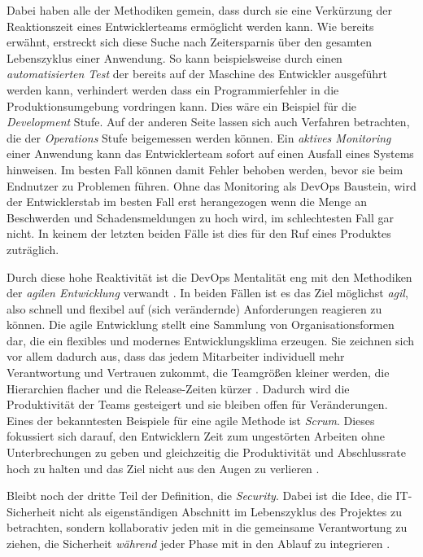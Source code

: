 Dabei haben alle der Methodiken gemein, dass durch sie eine Verkürzung der Reaktionszeit eines Entwicklerteams ermöglicht werden kann. 
Wie bereits erwähnt, erstreckt sich diese Suche nach Zeitersparnis über den gesamten Lebenszyklus einer Anwendung. So kann beispielsweise durch einen \emph{automatisierten Test} der bereits auf der Maschine des Entwickler ausgeführt werden kann, verhindert werden dass ein Programmierfehler in die Produktionsumgebung vordringen kann. Dies wäre ein Beispiel für die \emph{Development} Stufe. Auf der anderen Seite lassen sich auch Verfahren betrachten, die der \emph{Operations} Stufe beigemessen werden können. Ein \emph{aktives Monitoring} einer Anwendung kann das Entwicklerteam sofort auf einen Ausfall eines Systems hinweisen. Im besten Fall können damit Fehler behoben werden, bevor sie beim Endnutzer zu Problemen führen. Ohne das Monitoring als DevOps Baustein, wird der Entwicklerstab im besten Fall erst herangezogen wenn die Menge an Beschwerden und Schadensmeldungen zu hoch wird, im schlechtesten Fall gar nicht. In keinem der letzten beiden Fälle ist dies für den Ruf eines Produktes zuträglich.

Durch diese hohe Reaktivität ist die DevOps Mentalität eng mit den Methodiken der \emph{agilen Entwicklung} verwandt \cite{haufe-lexwaregmbhcokgAgileMethodenDefinition}. In beiden Fällen ist es das Ziel möglichst \emph{agil}, also schnell und flexibel auf (sich verändernde) Anforderungen reagieren zu können.
Die agile Entwicklung stellt eine Sammlung von Organisationsformen dar, die ein flexibles und modernes Entwicklungsklima erzeugen. Sie zeichnen sich vor allem dadurch aus, dass das jedem Mitarbeiter individuell mehr Verantwortung und Vertrauen zukommt, die Teamgrößen kleiner werden, die Hierarchien flacher und die Release-Zeiten kürzer \cite{haufe-lexwaregmbhcokgAgileMethodenDefinition}. Dadurch wird die Produktivität der Teams gesteigert und sie bleiben offen für Veränderungen. Eines der bekanntesten Beispiele für eine agile Methode ist \emph{Scrum}. Dieses fokussiert sich darauf, den Entwicklern Zeit zum ungestörten Arbeiten ohne Unterbrechungen zu geben und gleichzeitig die Produktivität und Abschlussrate hoch zu halten und das Ziel nicht aus den Augen zu verlieren \cite{froemlingAgileMethodenWas2021}.

Bleibt noch der dritte Teil der Definition, die \emph{Security}. Dabei ist die Idee, die IT-Sicherheit nicht als eigenständigen Abschnitt im Lebenszyklus des Projektes zu betrachten, sondern kollaborativ jeden mit in die gemeinsame Verantwortung zu ziehen, die Sicherheit \emph{während} jeder Phase mit in den Ablauf zu integrieren \cite{redheadWasIstDevSecOps}.

